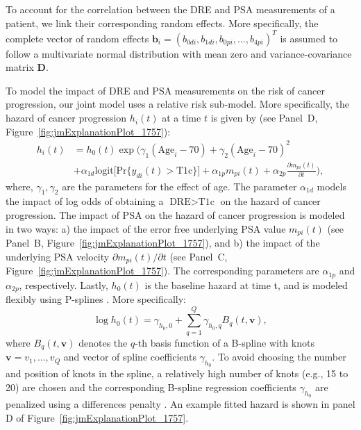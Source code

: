 To account for the correlation between the DRE and PSA measurements of a patient, we link their corresponding random effects. More specifically, the complete vector of random effects ${\boldsymbol{b}_i = (b_{0di}, b_{1di}, b_{0pi}, \ldots, b_{4pi})^T}$ is assumed to follow a multivariate normal distribution with mean zero and variance-covariance matrix $\boldsymbol{D}$.

To model the impact of DRE and PSA measurements on the risk of cancer progression, our joint model uses a relative risk sub-model. More specifically, the hazard of cancer progression $h_i(t)$ at a time $t$ is given by (see Panel~D, Figure~\ref{fig:jmExplanationPlot_1757}):
\begin{equation}
\label{eq:rel_risk_model}
\begin{split}
    h_i(t) &= h_0(t) \exp\Big(\gamma_1 (\mbox{Age}_i-70) + \gamma_2 (\mbox{Age}_i-70)^2\\
    &+\alpha_{1d} \mbox{logit} \big[\mbox{Pr}\{y_{di}(t) > \mbox{T1c}\}\big]+ \alpha_{1p} m_{pi}(t) + \alpha_{2p} \frac{\partial m_{pi}(t)}{\partial {t}}\Big),
    \end{split}
\end{equation}
where, $\gamma_1, \gamma_2$ are the parameters for the effect of age. The parameter $\alpha_{1d}$ models the impact of log odds of obtaining a $\mbox{DRE} > \mbox{T1c}$ on the hazard of cancer progression. The impact of PSA on the hazard of cancer progression is modeled in two ways: a) the impact of the error free underlying PSA value $m_{pi}(t)$ (see Panel~B, Figure~\ref{fig:jmExplanationPlot_1757}), and b) the impact of the underlying PSA velocity $\partial m_{pi}(t)/\partial {t}$ (see Panel~C, Figure~\ref{fig:jmExplanationPlot_1757}). The corresponding parameters are $\alpha_{1p}$ and $\alpha_{2p}$, respectively. Lastly, $h_0(t)$ is the baseline hazard at time t, and is modeled flexibly using P-splines \citep{eilers1996flexible}. More specifically:
\begin{equation*}
\log{h_0(t)} = \gamma_{h_0,0} + \sum_{q=1}^Q \gamma_{h_0,q} B_q(t, \boldsymbol{v}),
\end{equation*}
where $B_q(t, \boldsymbol{v})$ denotes the $q$-th basis function of a B-spline with knots $\boldsymbol{v} = v_1, \ldots, v_Q$ and vector of spline coefficients $\gamma_{h_0}$. To avoid choosing the number and position of knots in the spline, a relatively high number of knots (e.g., 15 to 20) are chosen and the corresponding B-spline regression coefficients $\gamma_{h_0}$ are penalized using a differences penalty \citep{eilers1996flexible}. An example fitted hazard is shown in panel D of Figure~\ref{fig:jmExplanationPlot_1757}.  

